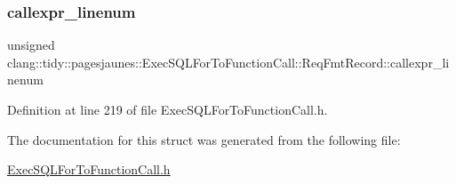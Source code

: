 \subsubsection{\texorpdfstring{callexpr\+\_\+linenum}{callexpr\_linenum}}
{\footnotesize\ttfamily unsigned clang\+::tidy\+::pagesjaunes\+::\+Exec\+S\+Q\+L\+For\+To\+Function\+Call\+::\+Req\+Fmt\+Record\+::callexpr\+\_\+linenum}



Definition at line 219 of file Exec\+S\+Q\+L\+For\+To\+Function\+Call.\+h.



The documentation for this struct was generated from the following file\+:\begin{DoxyCompactItemize}
\item 
\hyperlink{_exec_s_q_l_for_to_function_call_8h}{Exec\+S\+Q\+L\+For\+To\+Function\+Call.\+h}\end{DoxyCompactItemize}
